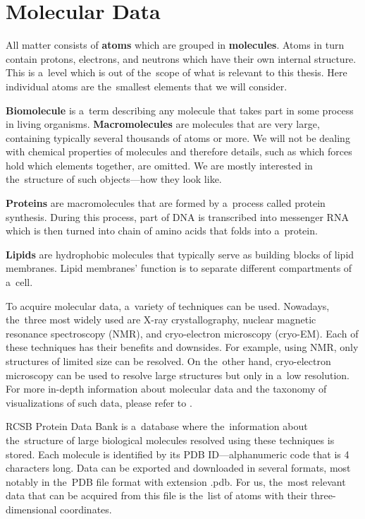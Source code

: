 \documentclass[
  digital, %
  table,   %
  nolof,     %
  nolot,     %
  oneside,
]{fithesis3}
\begin{document}
\section{Molecular Data}
All matter consists of \textbf{atoms} which are grouped in \textbf{molecules}. Atoms in turn contain protons, electrons, and neutrons which have their own internal structure. This is a level which is out of the scope of what is relevant to this thesis. Here individual atoms are the smallest elements that we will consider.

\textbf{Biomolecule} is a term describing any molecule that takes part in some process in living organisms. \textbf{Macromolecules} are molecules that are very large, containing typically several thousands of atoms or more. We will not be dealing with chemical properties of molecules and therefore details, such as which forces hold which elements together, are omitted. We are mostly interested in the structure of such objects—how they look like.

\textbf{Proteins} are macromolecules that are formed by a process called protein synthesis. During this process, part of DNA is transcribed into messenger RNA which is then turned into chain of amino acids that folds into a protein.

\textbf{Lipids} are hydrophobic molecules that typically serve as building blocks of lipid membranes. Lipid membranes' function is to separate different compartments of a cell.

To acquire molecular data, a variety of techniques can be used. Nowadays, the three most widely used are X-ray crystallography, nuclear magnetic resonance spectroscopy (NMR), and cryo-electron microscopy (cryo-EM). Each of these techniques has their benefits and downsides. For example, using NMR, only structures of limited size can be resolved. On the other hand, cryo-electron microscopy can be used to resolve large structures but only in a low resolution. For more in-depth information about molecular data and the taxonomy of visualizations of such data, please refer to \cite{BaraSTAR}.

RCSB Protein Data Bank \cite{ProteinDataBank} is a database where the information about the structure of large biological molecules resolved using these techniques is stored. Each molecule is identified by its PDB ID—alphanumeric code that is 4 characters long. Data can be exported and downloaded in several formats, most notably in the PDB file format with extension .pdb. For us, the most relevant data that can be acquired from this file is the list of atoms with their three-dimensional coordinates.
\end{document}
